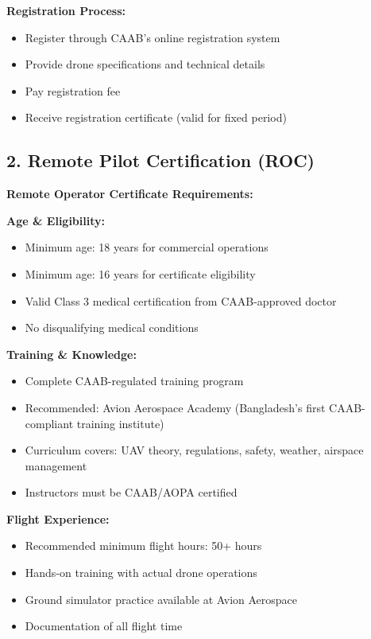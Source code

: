 \textbf{Registration Process:}
\begin{itemize}
    \item Register through CAAB's online registration system
    \item Provide drone specifications and technical details
    \item Pay registration fee
    \item Receive registration certificate (valid for fixed period)
\end{itemize}

\subsection{2. Remote Pilot Certification (ROC)}

\textbf{Remote Operator Certificate Requirements:}

\textbf{Age \& Eligibility:}
\begin{itemize}
    \item Minimum age: 18 years for commercial operations
    \item Minimum age: 16 years for certificate eligibility
    \item Valid Class 3 medical certification from CAAB-approved doctor
    \item No disqualifying medical conditions
\end{itemize}

\textbf{Training \& Knowledge:}
\begin{itemize}
    \item Complete CAAB-regulated training program
    \item Recommended: Avion Aerospace Academy (Bangladesh's first CAAB-compliant training institute)
    \item Curriculum covers: UAV theory, regulations, safety, weather, airspace management
    \item Instructors must be CAAB/AOPA certified
\end{itemize}

\textbf{Flight Experience:}
\begin{itemize}
    \item Recommended minimum flight hours: 50+ hours
    \item Hands-on training with actual drone operations
    \item Ground simulator practice available at Avion Aerospace
    \item Documentation of all flight time
\end{itemize}

